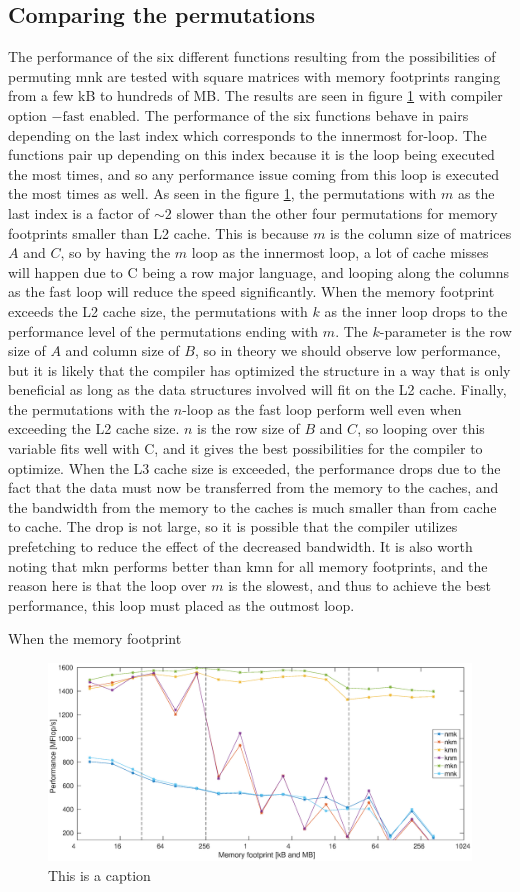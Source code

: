 \subsection{Comparing the permutations}
The performance of the six different functions resulting from the possibilities of permuting mnk are tested with square matrices with memory footprints ranging from a few kB to hundreds of MB. The results are seen in figure \ref{fig:comp1} with compiler option $\mathrm{-fast}$ enabled. The performance of the six functions behave in pairs depending on the last index which corresponds to the innermost for-loop. The functions pair up depending on this index because it is the loop being executed the most times, and so any performance issue coming from this loop is executed the most times as well. As seen in the figure \ref{fig:comp1}, the permutations with $m$ as the last index is a factor of $\sim 2$ slower than the other four permutations for memory footprints smaller than L2 cache. This is because $m$ is the column size of matrices $A$ and $C$, so by having the $m$ loop as the innermost loop, a lot of cache misses will happen due to C being a row major language, and looping along the columns as the fast loop will reduce the speed significantly. When the memory footprint exceeds the L2 cache size, the permutations with $k$ as the inner loop drops to the performance level of the permutations ending with $m$. The $k$-parameter is the row size of $A$ and column size of $B$, so in theory we should observe low performance, but it is likely that the compiler has optimized the structure in a way that is only beneficial as long as the data structures involved will fit on the L2 cache. Finally, the permutations with the $n$-loop as the fast loop perform well even when exceeding the L2 cache size. $n$ is the row size of $B$ and $C$, so looping over this variable fits well with C, and it gives the best possibilities for the compiler to optimize. When the L3 cache size is exceeded, the performance drops due to the fact that the data must now be transferred from the memory to the caches, and the bandwidth from the memory to the caches is much smaller than from cache to cache. The drop is not large, so it is possible that the compiler utilizes prefetching to reduce the effect of the decreased bandwidth. It is also worth noting that mkn performs better than kmn for all memory footprints, and the reason here is that the loop over $m$ is the slowest, and thus to achieve the best performance, this loop must placed as the outmost loop.

When the memory footprint 

\begin{figure}
\centering
\includegraphics[width = 1.1\textwidth]{fig/permGraph_fast.eps}
\caption{This is a caption}
\label{fig:comp1}
\end{figure}